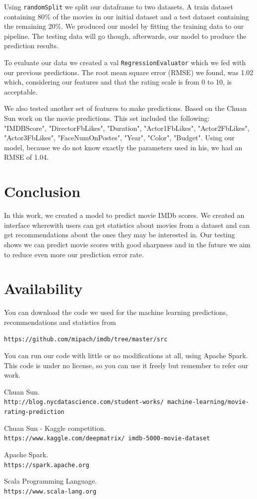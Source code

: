 \documentclass[letterpaper,twocolumn,10pt]{article}
\begin{document}
Using \texttt{randomSplit} we split our dataframe to two datasets. A train dataset containing 80\% of the movies in our initial dataset and a test dataset containing the remaining 20\%. We produced our model by fitting the training data to our pipeline. The testing data will go though, afterwards, our model to produce the prediction results.\par 

To evaluate our data we created a val \texttt{RegressionEvaluator} which we fed with our previous predictions. The root mean square error (RMSE) we found, was 1.02 which, considering our features and that the rating scale is from 0 to 10, is acceptable.

We also tested another set of features to make predictions. Based on the Chuan Sun work on the movie predictions. This set included the following: "IMDBScore", "DirectorFbLikes", "Duration", "Actor1FbLikes", "Actor2FbLikes", "Actor3FbLikes", "FaceNumOnPostes", "Year", "Color", "Budget". Using our model, because we do not know exactly the parameters used in his, we had an RMSE of 1.04. 
\section{Conclusion}

In this work, we created a model to predict movie IMDb scores. We created an interface wherewith users can get statistics about movies from a dataset and can get recommendations about the ones they may be interested in. Our testing shows we can predict movie scores with good sharpness and in the future we aim to reduce even more our prediction error rate.  

\section{Availability}

You can download the code we used for the machine learning predictions, recommendations and statistics from

\begin{center}
{\tt https://github.com/mipach/imdb/tree/master/src}\\
\end{center}

You can run our code with little or no modifications at all, using Apache Spark. This code is under no license, so you can use it freely but remember to refer our work.

\begin{thebibliography}{9}
	Chuan Sun.
	\\\texttt{http://blog.nycdatascience.com/student-works/
		machine-learning/movie-rating-prediction}
	
	Chuan Sun - Kaggle competition.
	\\\texttt{https://www.kaggle.com/deepmatrix/
		imdb-5000-movie-dataset}
	
	Apache Spark.
	\\\texttt{https://spark.apache.org}
	
	Scala Programming Language.
	\\\texttt{https://www.scala-lang.org}
\end{thebibliography}
\end{document}
